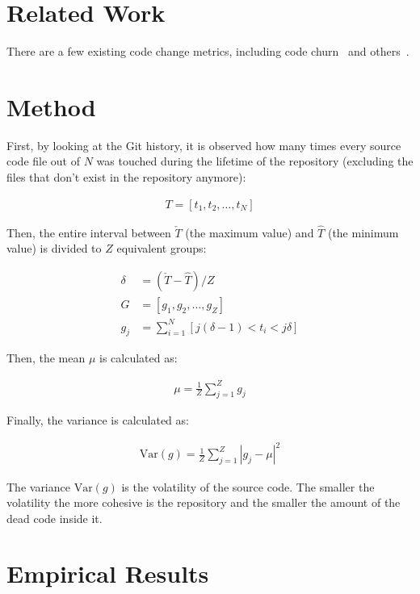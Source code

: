 \documentclass[12pt]{article}
\begin{document}
\section{Related Work}

There are a few existing code change metrics, including code churn~\citep{munson1998}
and others~\citep{fentonsoftware}.

\section{Method}
\label{sec:method}

First, by looking at the Git history,
it is observed how many times every source code file out of $N$ was touched
during the lifetime of the repository (excluding the files that don't exist
in the repository anymore):

\begin{eqnarray}
T = [t_1, t_2, \dots, t_N]
\end{eqnarray}

Then, the entire interval between $\check{T}$ (the maximum value)
and $\hat{T}$ (the minimum value) is divided to $Z$ equivalent groups:

\begin{align}
\delta &= ( \check{T} - \hat{T} ) / Z \\
G &= [g_1, g_2, \dots, g_{Z}] \\
g_j &= \sum_{i=1}^N [ j(\delta-1) < t_i < j\delta ]
\end{align}

Then, the mean $\mu$ is calculated as:

\begin{eqnarray}
\mu = \frac{1}{Z}\sum_{j=1}^{Z}{g_j}
\end{eqnarray}

Finally, the variance is calculated as:

\begin{eqnarray}
\text{Var}(g) = \frac{1}{Z}\sum_{j=1}^{Z}{|g_j - \mu|^2}
\end{eqnarray}

The variance $\text{Var}(g)$ is the volatility of the source code. The smaller
the volatility the more cohesive is the repository and the smaller
the amount of the dead code inside it.

\section{Empirical Results}
\end{document}
